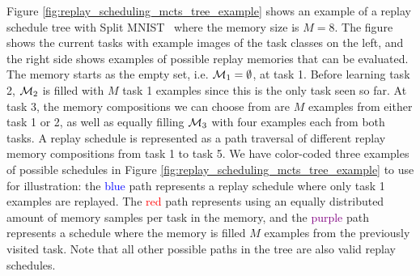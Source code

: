 Figure \ref{fig:replay_scheduling_mcts_tree_example} shows an example of a replay schedule tree with Split MNIST~ 
where the memory size is $M=8$. %
The figure shows the current tasks with example images of the task classes on the left, and the right side shows examples of possible replay memories that can be evaluated. The memory starts as the empty set, i.e. ${\mathcal{M}}_1 = \emptyset$, at task 1. Before learning task 2, ${\mathcal{M}}_2$ is filled with $M$ task 1 examples since this is the only task seen so far. At task 3, the memory compositions we can choose from are $M$ examples from either task 1 or 2, as well as equally filling ${\mathcal{M}}_3$ with four examples each from both tasks. 
A replay schedule is represented as a path traversal of different replay memory compositions from task 1 to task 5. We have color-coded three examples of possible schedules in Figure \ref{fig:replay_scheduling_mcts_tree_example} to use for illustration: the \textcolor{blue}{blue} path represents a replay schedule where only task 1 examples are replayed. %
The \textcolor{red}{red} path represents using an equally distributed amount of memory samples per task in the memory, and the \textcolor{purple}{purple} path represents a schedule where the memory is filled $M$ examples from the previously visited task. Note that all other possible paths in the tree are also valid replay schedules. 




